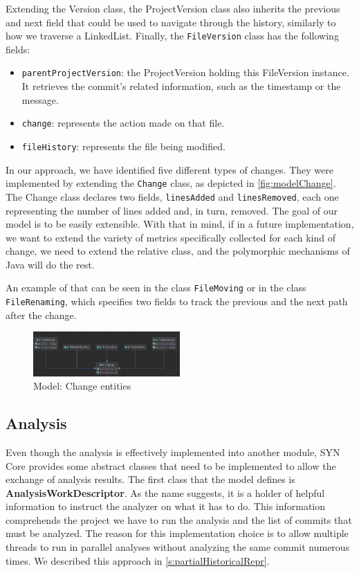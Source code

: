 Extending the Version class, the ProjectVersion class also inherits the previous and next field that could be used to navigate through the history, similarly to how we traverse a LinkedList. 
Finally, the \texttt{FileVersion} class has the following fields:
\begin{itemize}
    \item \texttt{parentProjectVersion}: the ProjectVersion holding this FileVersion instance. It retrieves the commit's related information, such as the timestamp or the message. 
    \item \texttt{change}: represents the action made on that file. 
    \item \texttt{fileHistory}: represents the file being modified. 
\end{itemize}

In our approach, we have identified five different types of changes. They were implemented by extending the \texttt{Change} class, as depicted in \autoref{fig:modelChange}. The Change class declares two fields, \texttt{linesAdded} and \texttt{linesRemoved}, each one representing the number of lines added and, in turn, removed. 
The goal of our model is to be easily extensible. With that in mind, if in a future implementation, we want to extend the variety of metrics specifically collected for each kind of change, we need to extend the relative class, and the polymorphic mechanisms of Java will do the rest. 

An example of that can be seen in the class \texttt{FileMoving} or in the class \texttt{FileRenaming}, which specifies two fields to track the previous and the next path after the change. 

\begin{figure}
    \center
    \includegraphics[width=0.5\textwidth]{UMLChanges.png}
    \caption{Model: Change entities}
    \label{fig:modelChange}
\end{figure}


\subsection*{Analysis}
Even though the analysis is effectively implemented into another module, SYN Core provides some abstract classes that need to be implemented to allow the exchange of analysis results. 
The first class that the model defines is \textbf{AnalysisWorkDescriptor}.
As the name suggests, it is a holder of helpful information to instruct the analyzer on what it has to do. This information comprehends the project we have to run the analysis and the list of commits that must be analyzed. 
The reason for this implementation choice is to allow multiple threads to run in parallel analyses without analyzing the same commit numerous times. 
We described this approach in \autoref{s:partialHistoricalRepr}.
\bigbreak

